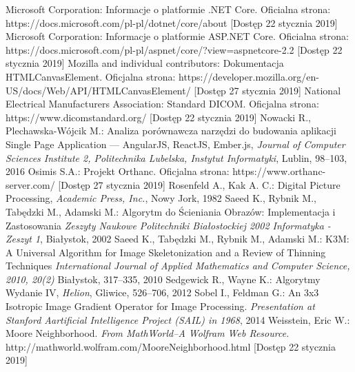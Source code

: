 \documentclass[a4paper,11pt,twoside,openright]{report}
\theoremstyle{definition}
\begin{document}
\begin{thebibliography}{24}
 Microsoft Corporation: Informacje o platformie .NET Core. Oficialna strona: https://docs.microsoft.com/pl-pl/dotnet/core/about [Dostęp 22 stycznia 2019]
 Microsoft Corporation: Informacje o platformie ASP.NET Core. Oficialna strona: https://docs.microsoft.com/pl-pl/aspnet/core/?view=aspnetcore-2.2 [Dostęp 22 stycznia 2019]
 Mozilla and individual contributors: Dokumentacja HTMLCanvasElement. Oficjalna strona: https://developer.mozilla.org/en-US/docs/Web/API/HTMLCanvasElement/ [Dostęp 27 stycznia 2019]
 National Electrical Manufacturers Association: Standard DICOM. Oficjalna strona: https://www.dicomstandard.org/ [Dostęp 22 stycznia 2019]
 Nowacki R., Plechawska-Wójcik M.: Analiza porównawcza narzędzi do budowania aplikacji Single Page Application --- AngularJS, ReactJS, Ember.js, \emph{Journal of Computer Sciences Institute 2, Politechnika Lubelska, Instytut Informatyki}, Lublin, 98--103, 2016
 Osimis S.A.: Projekt Orthanc. Oficjalna strona: https://www.orthanc-server.com/ [Dostęp 27 stycznia 2019]
 Rosenfeld A., Kak A. C.: Digital Picture Processing, \emph{Academic Press, Inc.}, Nowy Jork, 1982
 Saeed K., Rybnik M., Tabędzki M., Adamski M.: Algorytm do Ścieniania Obrazów: Implementacja i Zastosowania \emph{Zeszyty Naukowe Politechniki Białostockiej 2002 Informatyka - Zeszyt 1}, Białystok, 2002
 Saeed K., Tabędzki M., Rybnik M., Adamski M.: K3M: A Universal Algorithm for Image Skeletonization and a Review of Thinning Techniques \emph{International Journal of Applied Mathematics and Computer Science, 2010, 20(2)} Białystok, 317--335, 2010
 Sedgewick R., Wayne K.: Algorytmy Wydanie IV, \emph{Helion}, Gliwice, 526--706, 2012
 Sobel I., Feldman G.: An 3x3 Isotropic Image Gradient Operator for Image Processing. \emph {Presentation at Stanford Aartificial Intelligence Project (SAIL) in 1968}, 2014
  Weisstein, Eric W.: Moore Neighborhood. \emph{From MathWorld--A Wolfram Web Resource.} http://mathworld.wolfram.com/MooreNeighborhood.html  [Dostęp 22 stycznia 2019]

\end{thebibliography}
\end{document}
